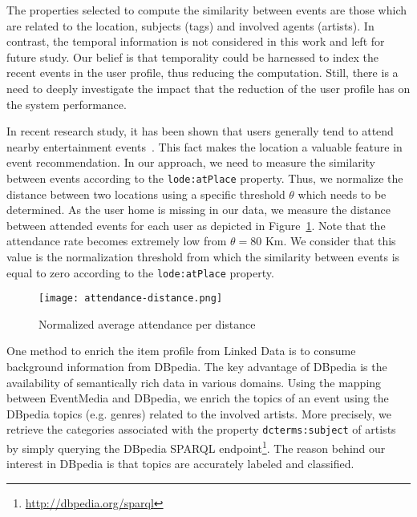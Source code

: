 The properties selected to compute the similarity between events are those which are related to the location, subjects (tags) and involved agents (artists). In contrast, the temporal information is not considered in this work and left for future study. Our belief is that temporality could be harnessed to index the recent events in the user profile, thus reducing the computation. Still, there is a need to deeply investigate the impact that the reduction of the user profile has on the system performance. 

In recent research study, it has been shown that users generally tend to attend nearby entertainment events~\cite{Quercia:ICDM10}. This fact makes the location a valuable feature in event recommendation. In our approach, we need to measure the similarity between events according to the \texttt{lode:atPlace} property. Thus, we normalize the distance between two locations using a specific threshold $\theta$ which needs to be determined. As the user home is missing in our data, we measure the distance between attended events for each user as depicted in Figure~\ref{fig:attendance-distance}. Note that the attendance rate becomes extremely low from $\theta=80$ Km. We consider that this value is the normalization threshold from which the similarity between events is equal to zero according to the \texttt{lode:atPlace} property.

\begin{figure}[H]
  \centering
  \texttt{[image: attendance-distance.png]}
  \caption{Normalized average attendance per distance}
  \label{fig:attendance-distance}
\end{figure}

 One method to enrich the item profile from Linked Data is to consume background information from DBpedia. The key advantage of DBpedia is the availability of semantically rich data in various domains. Using the mapping between EventMedia and DBpedia, we enrich the topics of an event using the DBpedia topics (e.g. genres) related to the involved artists. More precisely, we retrieve the categories associated with the property \texttt{dcterms:subject} of artists by simply querying the DBpedia SPARQL endpoint\footnote{\url{http://dbpedia.org/sparql}}. The reason behind our interest in DBpedia is that topics are accurately labeled and classified.

